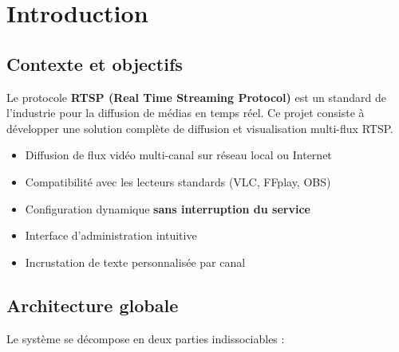 \documentclass[12pt,a4paper]{report}
\newcommand{\important}[1]{\textcolor{primaryBlue}{\textbf{#1}}}
\newcommand{\success}[1]{\textcolor{accentGreen}{\textbf{#1}}}
\newenvironment{infobox}[1]{%
    \begin{tcolorbox}[colback=lightGray!20, colframe=primaryBlue, title=#1, sharp corners]
}{%
    \end{tcolorbox}
}
\begin{document}
\tableofcontents
\newpage
\listoffigures
\newpage
\listoftables
\newpage

\chapter{Introduction}

\section{Contexte et objectifs}

Le protocole \important{RTSP (Real Time Streaming Protocol)} est un standard de l'industrie pour la diffusion de médias en temps réel. Ce projet consiste à développer une solution complète de diffusion et visualisation multi-flux RTSP.

\begin{infobox}{Objectifs du projet}
\begin{itemize}
    \item Diffusion de flux vidéo multi-canal sur réseau local ou Internet
    \item Compatibilité avec les lecteurs standards (VLC, FFplay, OBS)
    \item Configuration dynamique \success{sans interruption du service}
    \item Interface d'administration intuitive
    \item Incrustation de texte personnalisée par canal
\end{itemize}
\end{infobox}

\section{Architecture globale}

Le système se décompose en deux parties indissociables :
\end{document}
